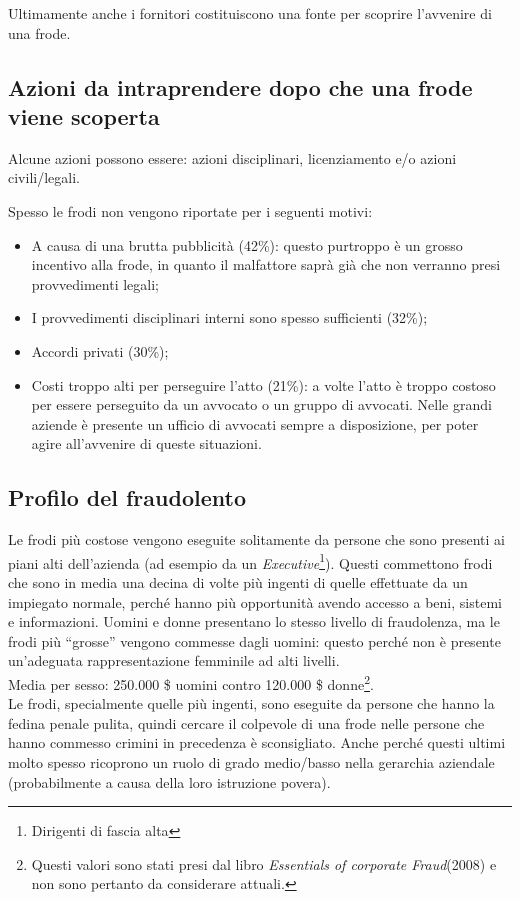 Ultimamente anche i fornitori costituiscono una fonte per scoprire l'avvenire 
di una frode.

\subsection{Azioni da intraprendere dopo che una frode viene scoperta}

Alcune azioni possono essere: azioni disciplinari, licenziamento e/o azioni 
civili/legali.

Spesso le frodi non vengono riportate per i seguenti motivi:
\begin{itemize}
  \item A causa di una brutta pubblicità (42\%): questo purtroppo è un grosso 
  incentivo alla frode, in quanto il malfattore
  saprà già che non verranno presi provvedimenti legali;
  \item I provvedimenti disciplinari interni sono spesso sufficienti (32\%);
  \item Accordi privati (30\%);
  \item Costi troppo alti per perseguire l'atto (21\%): a volte l'atto è troppo 
  costoso per essere perseguito da un avvocato o un
  gruppo di avvocati. Nelle grandi aziende è presente un ufficio di avvocati
  sempre a disposizione, per poter agire all'avvenire di queste situazioni.
\end{itemize}

\subsection{Profilo del fraudolento}

Le frodi più costose vengono eseguite solitamente da persone che sono presenti
ai piani alti dell'azienda (ad esempio da un \textit{Executive}\footnote{Dirigenti 
di fascia alta}). Questi commettono frodi che sono in media una decina di volte
più ingenti di quelle effettuate da un impiegato normale, perché hanno 
più opportunità avendo accesso a beni, sistemi e informazioni. Uomini e donne presentano 
lo stesso livello di fraudolenza, ma le frodi più ``grosse'' vengono commesse dagli 
uomini: questo perché non è presente un'adeguata rappresentazione femminile ad 
alti livelli.\\
\newline
Media per sesso: 250.000 \${} uomini contro 120.000 \${} 
donne\footnote{Questi valori sono stati presi dal libro \textit{Essentials
of corporate Fraud}(2008) e non sono pertanto da considerare attuali.}.\\
\newline
Le frodi, specialmente quelle più ingenti, sono eseguite da persone che hanno la fedina
penale pulita, quindi cercare il colpevole di una frode nelle persone che hanno commesso
 crimini in precedenza è sconsigliato. Anche perché questi ultimi molto spesso ricoprono 
un ruolo di grado medio/basso nella gerarchia aziendale (probabilmente a causa della 
loro istruzione povera).

